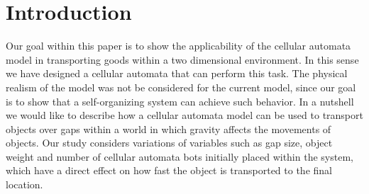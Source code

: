 \section{Introduction}
\label{sec:intro}

Our goal within this paper is to show the applicability of the cellular automata model in transporting goods within a two dimensional environment. In this sense we have designed a cellular automata that can perform this task. The physical realism of the model was not be considered for the current model, since our goal is to show that a self-organizing system can achieve such behavior. In a nutshell we would like to describe how a cellular automata model can be used to transport objects over gaps within a world in which gravity affects the movements of objects. Our study considers variations of variables such as gap size, object weight and number of cellular automata bots initially placed within the system, which have a direct effect on how fast the object is transported to the final location. 

